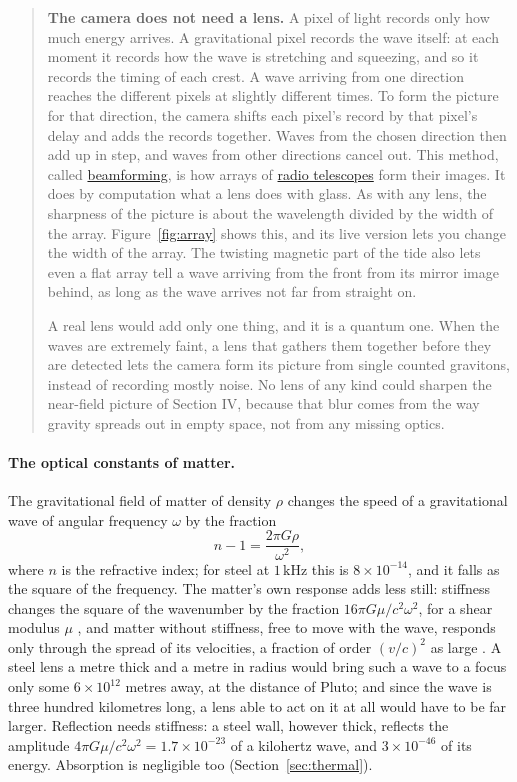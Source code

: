 \begin{quote}
\textbf{The camera does not need a lens.} A pixel of light records only how much
energy arrives. A gravitational pixel records the wave itself: at each moment
it records how the wave is stretching and squeezing, and so it records the
timing of each crest. A wave arriving from one direction reaches the different
pixels at slightly different times. To form the picture for that direction,
the camera shifts each pixel's record by that pixel's delay and adds the
records together. Waves from the chosen direction then add up in step, and
waves from other directions cancel out. This method, called
\href{https://en.wikipedia.org/wiki/Beamforming}{beamforming}, is how arrays of
\href{https://en.wikipedia.org/wiki/Radio_telescope}{radio telescopes} form
their images. It does by computation what a lens does with glass. As with any
lens, the sharpness of the picture is about the wavelength divided by the width
of the array. Figure~\ref{fig:array} shows this, and its live version lets you change the width of the array. The twisting magnetic part of the tide also lets even a flat
array tell a wave arriving from the front from its mirror image behind, as long as
the wave arrives not far from straight on.

A real lens would add only one thing, and it is a quantum one. When the waves
are extremely faint, a lens that gathers them together before they are detected
lets the camera form its picture from single counted gravitons, instead of
recording mostly noise. No
lens of any kind could sharpen the near-field picture of Section IV, because
that blur comes from the way gravity spreads out in empty space, not from any
missing optics.
\end{quote}

\paragraph{The optical constants of matter.} The gravitational field of matter of
density $\rho$ changes the speed of a gravitational wave of angular frequency
$\omega$ by the fraction \cite{Peters1974}
\begin{equation}\label{eq:index}
n - 1 = \frac{2\pi G \rho}{\omega^{2}} ,
\end{equation}
where $n$ is the refractive index; for steel at $1\,\mathrm{kHz}$ this is
$8\times10^{-14}$, and it falls as the square of
the frequency. The matter's own response adds less still: stiffness changes the
square of the wavenumber by the fraction $16\pi G\mu/c^2\omega^2$, for a shear
modulus $\mu$ \cite{Press1979}, and matter without
stiffness, free to move with the wave, responds only through the spread of its
velocities, a fraction of order $(v/c)^2$ as large \cite{FlaugerWeinberg2018}. A steel lens a metre thick and a metre in radius would bring such a wave to a
focus only some $6\times10^{12}$ metres away, at the distance of Pluto; and since the wave
is three hundred kilometres long, a lens able to act on it at all would have
to be far larger. Reflection needs stiffness: a steel wall, however thick, reflects the amplitude
$4\pi G\mu/c^2\omega^2 = 1.7\times10^{-23}$ of a kilohertz wave, and
$3\times10^{-46}$ of its energy. Absorption is negligible too
(Section~\ref{sec:thermal}).


